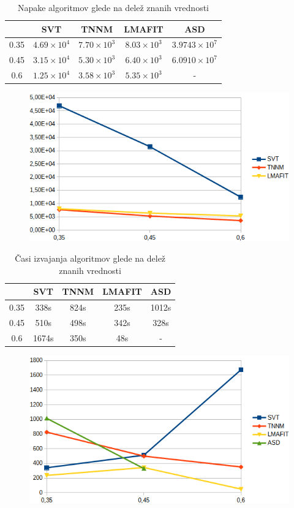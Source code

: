 \begin{table}[h]
    \centering
    \begin{tabular}{|c|c|c|c|c|}
    \hline
    & SVT & TNNM & LMAFIT & ASD \\ \hline
    0.35 & $4.69 \times 10^4$ & $7.70 \times 10^3$ & $8.03 \times 10^3$ & $3.9743 \times 10^7$ \\ \hline
    0.45 & $3.15 \times 10^4$ & $5.30 \times 10^3$ & $6.40 \times 10^3$ & $6.0910 \times 10^7$ \\ \hline
    0.6 & $1.25 \times 10^4$ & $3.58 \times 10^3$ & $5.35 \times 10^3$ & - \\ \hline
    \end{tabular}
    \caption{Napake algoritmov glede na delež znanih vrednosti}
\end{table}
\begin{figure}[!ht]
    \centering
    \includegraphics[width=0.95\linewidth]{Poglavja/Slike/grayscale1000/grafNapake.png}
\end{figure}

\begin{table}[h]
    \centering
    \begin{tabular}{|c|c|c|c|c|}
    \hline
    & SVT & TNNM & LMAFIT & ASD \\ \hline
    0.35 & 338s & 824s & 235s & 1012s \\ \hline
    0.45 & 510s & 498s & 342s & 328s\\ \hline
    0.6 & 1674s & 350s & 48s & - \\ \hline
    \end{tabular}
    \caption{Časi izvajanja algoritmov glede na delež znanih vrednosti}
\end{table}
\begin{figure}[!ht]
    \centering
    \includegraphics[width=0.95\linewidth]{Poglavja/Slike/grayscale1000/grafCas.png}
\end{figure}